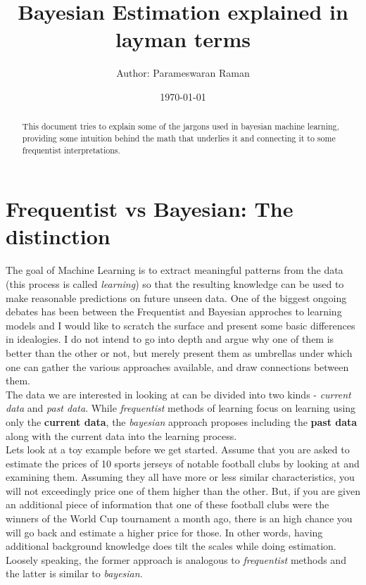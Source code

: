 \documentclass[a4paper]{article}
\title{Bayesian Estimation explained in layman terms}
\author{Author: Parameswaran Raman}
\date{\today}
\begin{document}

\maketitle

\begin{abstract}
\noindent This document tries to explain some of the jargons used in bayesian machine learning, providing some intuition behind the math that underlies it and connecting it to some frequentist interpretations.
\end{abstract}

\section{Frequentist vs Bayesian: The distinction}

\noindent The goal of Machine Learning is to extract meaningful patterns from the data (this process is called \textit{learning}) so that the resulting knowledge can be used to make reasonable predictions on future unseen data. One of the biggest ongoing debates has been between the Frequentist and Bayesian approches to learning models and I would like to scratch the surface and present some basic differences in idealogies. I do not intend to go into depth and argue why one of them is better than the other or not, but merely present them as umbrellas under which one can gather the various approaches available, and draw connections between them.\\

\noindent The data we are interested in looking at can be divided into two kinds - \textit{current data} and \textit{past data}. While \textit{frequentist} methods of learning focus on learning using only the \textbf{current data}, the \textit{bayesian} approach proposes including the \textbf{past data} along with the current data into the learning process. \\

\noindent Lets look at a toy example before we get started. Assume that you are asked to estimate the prices of 10 sports jerseys of notable football clubs by looking at and examining them. Assuming they all have more or less similar characteristics, you will not exceedingly price one of them higher than the other. But, if you are given an additional piece of information that one of these football clubs were the winners of the World Cup tournament a month ago, there is an high chance you will go back and estimate a higher price for those. In other words, having additional background knowledge does tilt the scales while doing estimation. Loosely speaking, the former approach is analogous to \textit{frequentist} methods and the latter is similar to \textit{bayesian}.\\
\end{document}
